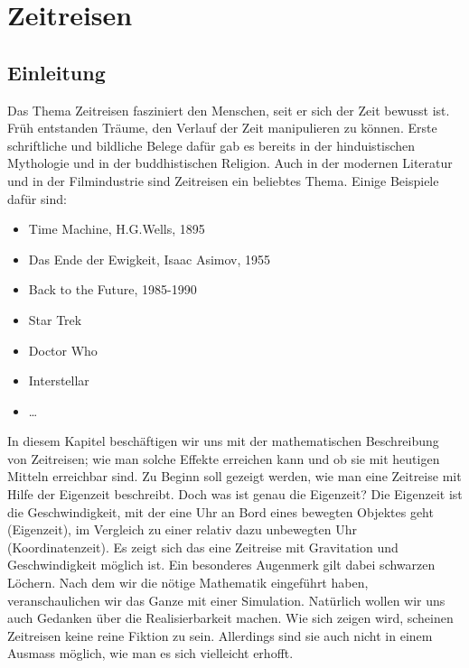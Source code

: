 \chapter{Zeitreisen\label{chapter:thema}}
\begin{refsection}
\section{Einleitung}

	Das Thema Zeitreisen fasziniert den Menschen, seit er sich der Zeit bewusst ist. Früh entstanden Träume, den Verlauf der Zeit manipulieren zu können. Erste schriftliche und bildliche Belege dafür gab es bereits in der hinduistischen Mythologie und in der buddhistischen Religion. Auch in der modernen Literatur und in der Filmindustrie sind Zeitreisen ein beliebtes Thema. Einige Beispiele daf\"ur sind: 
\begin{itemize}
    \item Time Machine, H.G.Wells, 1895 
    \item Das Ende der Ewigkeit, Isaac Asimov, 1955
    \item Back to the Future, 1985-1990
    \item Star Trek
    \item Doctor Who
    \item Interstellar
    \item \dots

\end{itemize}
In diesem Kapitel beschäftigen wir uns mit der mathematischen Beschreibung von Zeitreisen; wie man solche Effekte erreichen kann und ob sie mit heutigen Mitteln erreichbar sind. Zu Beginn soll gezeigt werden, wie man eine Zeitreise mit Hilfe der Eigenzeit beschreibt.
Doch was ist genau die Eigenzeit? 
Die Eigenzeit ist die Geschwindigkeit, mit der eine Uhr an Bord eines bewegten Objektes geht (Eigenzeit), im Vergleich zu einer relativ dazu unbewegten Uhr (Koordinatenzeit). 
Es zeigt sich das eine Zeitreise mit Gravitation und Geschwindigkeit möglich ist. Ein besonderes Augenmerk gilt dabei schwarzen Löchern. Nach dem wir die nötige Mathematik eingeführt haben, veranschaulichen wir das Ganze mit einer Simulation. Natürlich wollen wir uns auch Gedanken über die Realisierbarkeit machen. Wie sich zeigen wird, scheinen Zeitreisen keine reine Fiktion zu sein. Allerdings sind sie auch nicht in einem Ausmass möglich, wie man es sich vielleicht erhofft.


\end{refsection}
